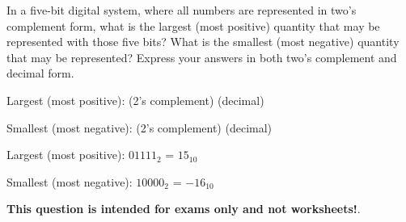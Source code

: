

In a five-bit digital system, where all numbers are represented in two's complement form, what is the largest (most positive) quantity that may be represented with those five bits?  What is the smallest (most negative) quantity that may be represented?  Express your answers in both two's complement and decimal form.

\vskip 10pt

\noindent
Largest (most positive): \hskip 10pt \underbar{\hskip 80pt} (2's complement) \hskip 40pt \underbar{\hskip 80pt} (decimal)

\vskip 10pt

\noindent
Smallest (most negative): \hskip 10pt \underbar{\hskip 80pt} (2's complement) \hskip 40pt \underbar{\hskip 80pt} (decimal)







Largest (most positive): $01111_2$ = $15_{10}$

\vskip 10pt

Smallest (most negative): $10000_2$ = $-16_{10}$







{\bf This question is intended for exams only and not worksheets!}.




